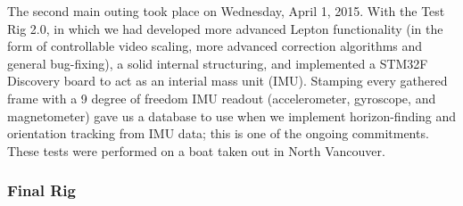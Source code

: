 The second main outing took place on Wednesday, April 1, 2015. With the Test Rig 2.0, in which we had developed more advanced Lepton functionality (in the form of controllable video scaling, more advanced correction algorithms and general bug-fixing), a solid internal structuring, and implemented a STM32F Discovery board to act as an interial mass unit (IMU). Stamping every gathered frame with a 9 degree of freedom IMU readout (accelerometer, gyroscope, and magnetometer) gave us a database to use when we implement horizon-finding and orientation tracking from IMU data; this is one of the ongoing commitments. These tests were performed on a boat taken out in North Vancouver.


\subsubsection{\label{sec:discussion:testing:testrig3}Final Rig}

